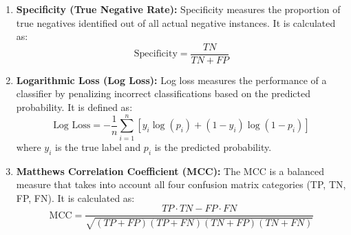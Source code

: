 \begin{enumerate}
    \item \textbf{Specificity (True Negative Rate):} 
    Specificity measures the proportion of true negatives identified out of all actual negative instances. It is calculated as:
    \[
    \text{Specificity} = \frac{TN}{TN + FP}
    \]

    \item \textbf{Logarithmic Loss (Log Loss):} 
    Log loss measures the performance of a classifier by penalizing incorrect classifications based on the predicted probability. It is defined as:
    \[
    \text{Log Loss} = -\frac{1}{n} \sum_{i=1}^{n} [y_i \log(p_i) + (1 - y_i) \log(1 - p_i)]
    \]
    where \(y_i\) is the true label and \(p_i\) is the predicted probability.

    \item \textbf{Matthews Correlation Coefficient (MCC):} 
    The MCC is a balanced measure that takes into account all four confusion matrix categories (TP, TN, FP, FN). It is calculated as:
    \[
    \text{MCC} = \frac{TP \cdot TN - FP \cdot FN}{\sqrt{(TP + FP)(TP + FN)(TN + FP)(TN + FN)}}
    \]
\end{enumerate}
